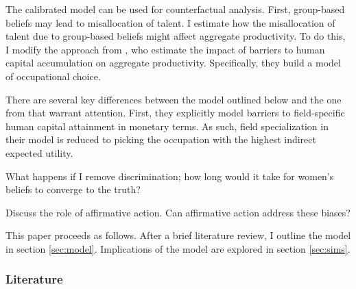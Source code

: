 \documentclass[11 pt]{article}
\newcommand{\toedit}[1]{{\color{gray}#1}}
\newcommand{\toedit}[1]{#1}
\begin{document}
\toedit{
The calibrated model can be used for counterfactual analysis. 
First, group-based beliefs may lead to misallocation of talent.
I estimate how the misallocation of talent due to group-based beliefs might affect aggregate productivity. 
To do this, I modify the approach from \textcite{HHJK19}, who estimate the impact of barriers to human capital accumulation on aggregate productivity.
Specifically, they build a \textcite{R51} model of occupational choice.

There are several key differences between the model outlined below and the one from \textcite{HHJK19} that warrant attention.
%
First, they explicitly model barriers to field-specific human capital attainment in monetary terms. 
As such, field specialization in their model is reduced to picking the occupation with the highest indirect expected utility.
%
% 


} %

\toedit{
    What happens if I remove discrimination; how long would it take for women's beliefs to converge to the truth?
}

\toedit{
    Discuss the role of affirmative action. Can affirmative action address these biases?
}

This paper proceeds as follows. After a brief literature review, I outline the model in section \ref{sec:model}. Implications of the model are explored in section \ref{sec:sims}. 

\subsubsection*{Literature}
\end{document}
